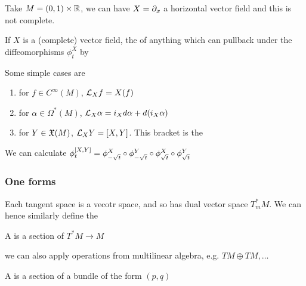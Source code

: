 \documentclass{article}
\begin{document}
\begin{example}
	Take $M = (0,1) \times \mbb{R}$, we can have $X = \del_x$ a horizontal vector field and this is not complete. 
\end{example}

\begin{definition}
	If $X$ is a (complete) vector field, the  of anything which can pullback under the diffeomorphisms $\phi_t^X$ by 
\end{definition}

\begin{example}
	Some simple cases are 
	\begin{enumerate}
		\item for $f \in C^\infty(M)$, $\mc{L}_X f = X(f)$
		\item for $\alpha \in \Omega^\ast(M)$, $\mc{L}_X \alpha = i_X d\alpha + d(i_X \alpha)$
		\item for $Y \in \mf{X}(M)$, $\mc{L}_X Y = \comm[X]{Y}$. This bracket is the 
	\end{enumerate}
\end{example}
\begin{lemma}
	We can calculate $\phi^{\comm[X]{Y}}_t = \phi^X_{-\sqrt{t}} \circ \phi^Y_{-\sqrt{t}} \circ \phi^X_{\sqrt{t}} \circ \phi^Y_{\sqrt{t}}$
\end{lemma}


\subsubsection{One forms}
Each tangent space is a vecotr space, and so has dual vector space $T_m^\ast M$. We can hence similarly define the  

\begin{definition}
A  is a section of $T^\ast M \to M$
\end{definition}
we can also apply operations from multilinear algebra, e.g. $TM \oplus TM, \dots$

\begin{definition}
A  is a section of a bundle of the form $(p,q)$
\end{definition}
\end{document}
